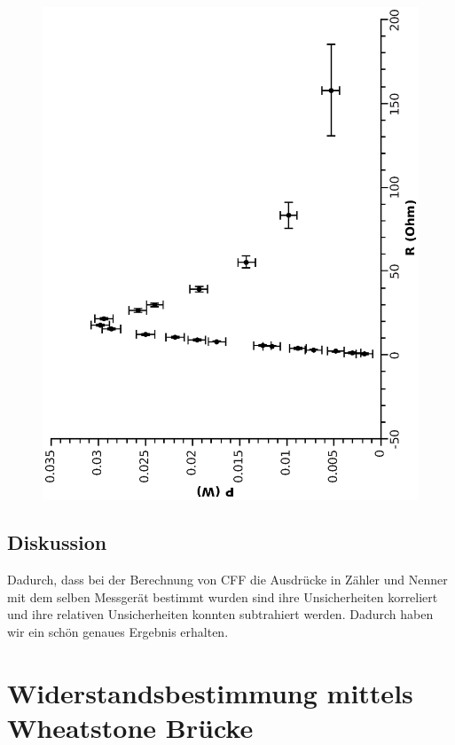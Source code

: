 \documentclass{article}
\begin{document}
\begin{center}
\begin{figure}
\includegraphics[scale=0.7,angle=-90]{leistung.eps}
\end{figure}
\end{center}
\subsection{Diskussion}
Dadurch, dass bei der Berechnung von CFF die Ausdrücke in Zähler und Nenner mit dem selben Messgerät bestimmt wurden sind ihre Unsicherheiten korreliert und ihre relativen Unsicherheiten konnten subtrahiert werden. Dadurch haben wir ein schön genaues Ergebnis erhalten.


\newpage



\section{Widerstandsbestimmung mittels Wheatstone Brücke}
\end{document}
